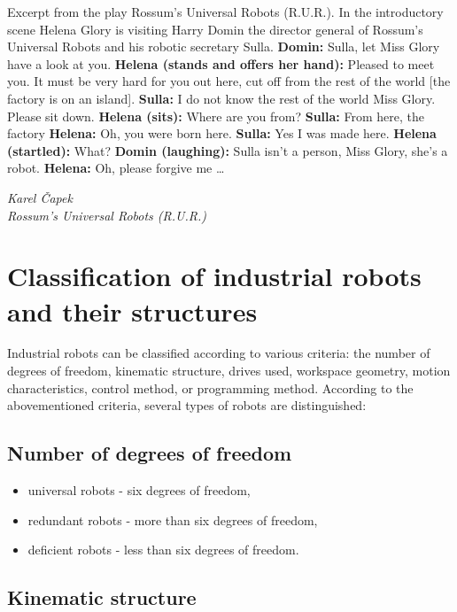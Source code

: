 \epigraph{

Excerpt from the play Rossum’s Universal Robots (R.U.R.).\break
In the introductory scene Helena Glory is visiting Harry Domin the director general of Rossum’s Universal Robots and his robotic secretary Sulla.\break
\break
\textbf{Domin:} Sulla, let Miss Glory have a look at you.\break
\textbf{Helena (stands and offers her hand):} Pleased to meet you. It must be very hard for you out here, cut off from the rest of the world [the factory is on an island].\break
\textbf{Sulla:} I do not know the rest of the world Miss Glory. Please sit down.\break
\textbf{Helena (sits):} Where are you from?\break
\textbf{Sulla:} From here, the factory\break
\textbf{Helena:} Oh, you were born here.\break
\textbf{Sulla:} Yes I was made here.\break
\textbf{Helena (startled):} What?\break
\textbf{Domin (laughing):} Sulla isn’t a person, Miss Glory, she’s a robot.\break
\textbf{Helena:} Oh, please forgive me …
}{\textit{Karel Čapek \\ Rossum’s Universal Robots (R.U.R.)}}

\section{Classification of industrial robots and their structures}

Industrial robots can be classified according to various criteria: the number of degrees of freedom, kinematic structure, drives used, workspace geometry, motion characteristics, control method, or programming method. According to the abovementioned criteria, several types of robots are distinguished:

\subsection*{Number of degrees of freedom}

\begin{itemize}
    \item universal robots - six degrees of freedom,
    \item redundant robots - more than six degrees of freedom,
    \item deficient robots - less than six degrees of freedom.
\end{itemize}

\subsection*{Kinematic structure}

